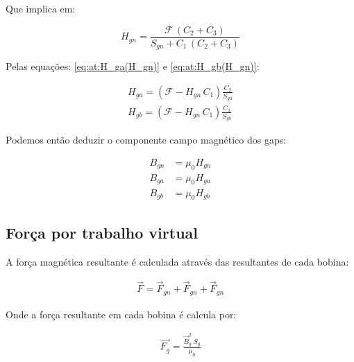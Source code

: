 Que implica em:

\begin{equation}
	H_{gn}  = \frac{\mathcal{F} \, (C_2 + C_3)}{S_{gn} + C_1 \, (C_2 + C_3)}
\end{equation}

Pelas equações: \eqref{eq:at:H_ga(H_gn)} e \eqref{eq:at:H_gb(H_gn)}:

\begin{align}
	H_{ga} = (\mathcal{F} - H_{gn} \, C_1) \frac{C_2 }{S_{ga}} \\
	H_{gb} = (\mathcal{F} - H_{gn} \, C_1)\frac{C_3 }{S_{gb}}
\end{align}

Podemos então deduzir o componente campo magnético dos gaps:

\begin{align}
	B_{gn} &= \mu_0 H_{gn} \\
	B_{ga} &= \mu_0 H_{ga} \\
	B_{gb} &= \mu_0 H_{gb} 
\end{align}

\subsection{Força por trabalho virtual}

A força magnética resultante é calculada através das resultantes de cada bobina:

\begin{align}
	\vec{F} = \vec{F}_{gn} + \vec{F}_{gn} + \vec{F}_{gn} \label{eq:ativo:F:resultante}
\end{align}

Onde a força resultante em cada bobina é calcula por:

\begin{align}
	\vec{F_{g}} = \frac{\vec{B}_g^2 \; S_g}{\mu_0} 
\end{align}




